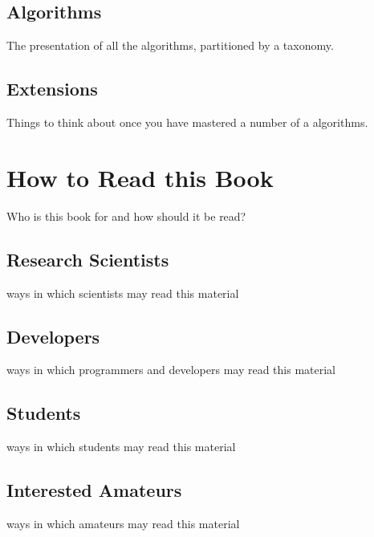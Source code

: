 \subsection{Algorithms}
The presentation of all the algorithms, partitioned by a taxonomy.

\subsection{Extensions}
Things to think about once you have mastered a number of a algorithms.



\section{How to Read this Book}
Who is this book for and how should it be read?


\subsection{Research Scientists}
ways in which scientists may read this material

\subsection{Developers}
ways in which programmers and developers may read this material

\subsection{Students}
ways in which students may read this material

\subsection{Interested Amateurs}
ways in which amateurs may read this material

